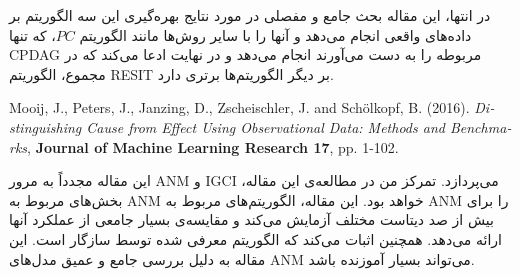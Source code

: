 \documentclass{article}
\begin{document}
\begin{enumerate}
در انتها، این مقاله بحث جامع و مفصلی در مورد نتایج بهره‌گیری این سه الگوریتم بر داده‌های واقعی انجام می‌دهد و آنها را با سایر روش‌ها مانند الگوریتم $PC$، که تنها CPDAG مربوطه را به دست می‌آورند انجام می‌دهد و در نهایت ادعا می‌کند که در مجموع، الگوریتم RESIT بر دیگر الگوریتم‌‌ها برتری دارد.
\vspace{1cm}
\begin{latin}
	Mooij, J., Peters, J.,  Janzing, D., Zscheischler, J. and Sch{\"o}lkopf, B.  (2016).
	\textit{Distinguishing Cause from Effect Using Observational Data:
		Methods and Benchmarks}, \textbf{Journal of Machine Learning Research 17}, pp. 1-102.
\end{latin}
این مقاله مجدداً به مرور ANM و IGCI می‌پردازد. تمرکز من در مطالعه‌ی این مقاله، بخش‌های مربوط به ANM خواهد بود. این مقاله،‌ الگوریتم‌های مربوط به ANM را برای بیش از صد دیتاست مختلف آزمایش می‌کند و مقایسه‌ی بسیار جامعی از عملکرد آنها ارائه می‌دهد.  همچنین اثبات می‌کند که الگوریتم معرفی شده توسط 
سازگار است. این مقاله به دلیل بررسی  جامع و عمیق مدل‌های ANM می‌تواند بسیار آموزنده باشد.
\end{enumerate}
\end{document}
